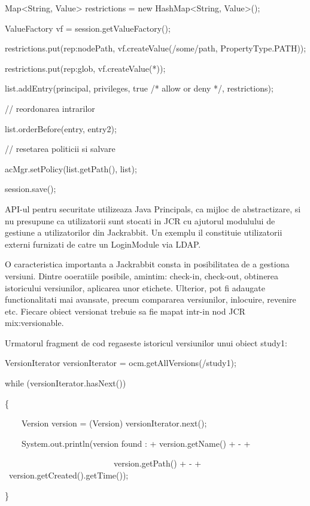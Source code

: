 \documentclass{article}
\begin{document}
Map{\textless}String, Value{\textgreater} restrictions = new HashMap{\textless}String, Value{\textgreater}();

ValueFactory vf = session.getValueFactory();

restrictions.put({\textquotedbl}rep:nodePath{\textquotedbl}, vf.createValue({\textquotedbl}/some/path{\textquotedbl}, PropertyType.PATH));

restrictions.put({\textquotedbl}rep:glob{\textquotedbl}, vf.createValue({\textquotedbl}*{\textquotedbl}));

list.addEntry(principal, privileges, true /* allow or deny */, restrictions);


\bigskip

// reordonarea intrarilor

list.orderBefore(entry, entry2);


\bigskip

// resetarea politicii si salvare

acMgr.setPolicy(list.getPath(), list);

session.save();


\bigskip

API-ul pentru securitate utilizeaza Java Principals, ca mijloc de abstractizare, si nu presupune ca utilizatorii sunt stocati in JCR cu ajutorul modulului de gestiune a utilizatorilor din Jackrabbit. Un exemplu il constituie utilizatorii externi furnizati de catre un LoginModule via LDAP.


\bigskip

O caracteristica importanta a Jackrabbit consta in posibilitatea de a gestiona versiuni. Dintre ooeratiile posibile, amintim: check-in, check-out, obtinerea istoricului versiunilor, aplicarea unor etichete. Ulterior, pot fi adaugate functionalitati mai avansate, precum compararea versiunilor, inlocuire, revenire etc. Fiecare obiect versionat trebuie sa fie mapat intr-in nod JCR mix:versionable. \ 


\bigskip

Urmatorul fragment de cod regaseste istoricul versiunilor unui obiect study1:


\bigskip

VersionIterator versionIterator = ocm.getAllVersions({\textquotedbl}/study1{\textquotedbl});

while (versionIterator.hasNext())

\{

\ \ \ \ Version version = (Version) versionIterator.next();

\ \ \ \ System.out.println({\textquotedbl}version found : {\textquotedbl}+ version.getName() + {\textquotedbl} - {\textquotedbl} +

\ \ \ \ \ \ \ \ \ \ \ \ \ \ \ \ \ \ \ \ \ \ \ \ \ \ version.getPath() + {\textquotedbl} - {\textquotedbl} + \ version.getCreated().getTime());

\}
\end{document}
